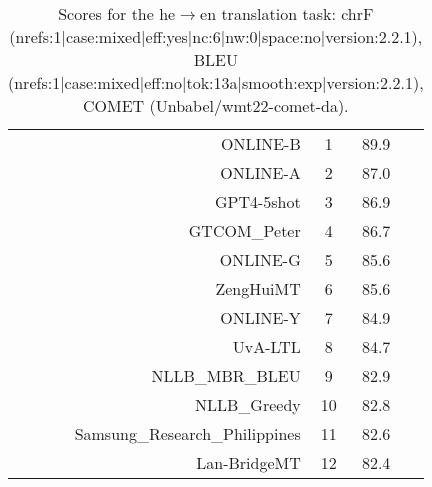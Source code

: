 \documentclass[11pt]{article}
\begin{document}
\begin{table}
\begin{subtable}[t]{0.33\textwidth}
\begin{tabular}{rccc}
\midrule 
ONLINE-B & 1 & 89.9 \\ 
ONLINE-A & 2 & 87.0 \\ 
GPT4-5shot & 3 & 86.9 \\ 
GTCOM\_Peter & 4 & 86.7 \\ 
ONLINE-G & 5 & 85.6 \\ 
ZengHuiMT & 6 & 85.6 \\ 
ONLINE-Y & 7 & 84.9 \\ 
UvA-LTL & 8 & 84.7 \\ 
NLLB\_MBR\_BLEU & 9 & 82.9 \\ 
NLLB\_Greedy & 10 & 82.8 \\ 
Samsung\_Research\_Philippines & 11 & 82.6 \\ 
Lan-BridgeMT & 12 & 82.4 \\ 
\bottomrule 
\end{tabular} 
\end{subtable} 
\caption{Scores for the he$\rightarrow$en translation task: chrF (nrefs:1|case:mixed|eff:yes|nc:6|nw:0|space:no|version:2.2.1), BLEU (nrefs:1|case:mixed|eff:no|tok:13a|smooth:exp|version:2.2.1), COMET (Unbabel/wmt22-comet-da).} 
\end{table} 
\end{document}
